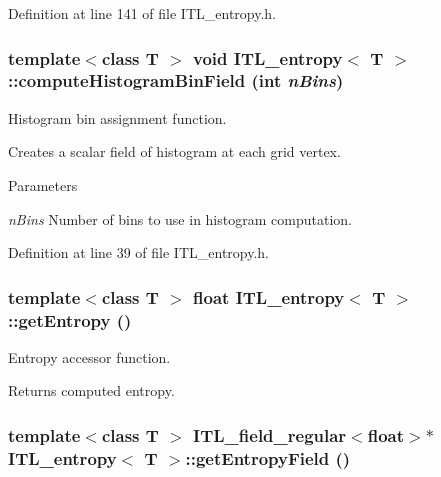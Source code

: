 Definition at line 141 of file ITL\_\-entropy.h.

\hypertarget{classITL__entropy_a39aa28b0d3d0964bee919d23fe3768d7}{
\subsubsection[{computeHistogramBinField}]{\setlength{\rightskip}{0pt plus 5cm}template$<$class T $>$ void {\bf ITL\_\-entropy}$<$ T $>$::computeHistogramBinField (int {\em nBins})}}
\label{classITL__entropy_a39aa28b0d3d0964bee919d23fe3768d7}


Histogram bin assignment function. 

Creates a scalar field of histogram at each grid vertex. 
\begin{DoxyParams}{Parameters}
\item[{\em nBins}]Number of bins to use in histogram computation. \end{DoxyParams}


Definition at line 39 of file ITL\_\-entropy.h.

\hypertarget{classITL__entropy_ad953a52d2910a04ead0fc40e5af10590}{
\subsubsection[{getEntropy}]{\setlength{\rightskip}{0pt plus 5cm}template$<$class T $>$ float {\bf ITL\_\-entropy}$<$ T $>$::getEntropy ()}}
\label{classITL__entropy_ad953a52d2910a04ead0fc40e5af10590}


Entropy accessor function. 

\begin{DoxyReturn}{Returns}
computed entropy. 
\end{DoxyReturn}
\hypertarget{classITL__entropy_a640b8cb03be2ce05dcdb5ffa683dd9c9}{
\subsubsection[{getEntropyField}]{\setlength{\rightskip}{0pt plus 5cm}template$<$class T $>$ {\bf ITL\_\-field\_\-regular}$<$float$>$$\ast$ {\bf ITL\_\-entropy}$<$ T $>$::getEntropyField ()}}
\label{classITL__entropy_a640b8cb03be2ce05dcdb5ffa683dd9c9}


